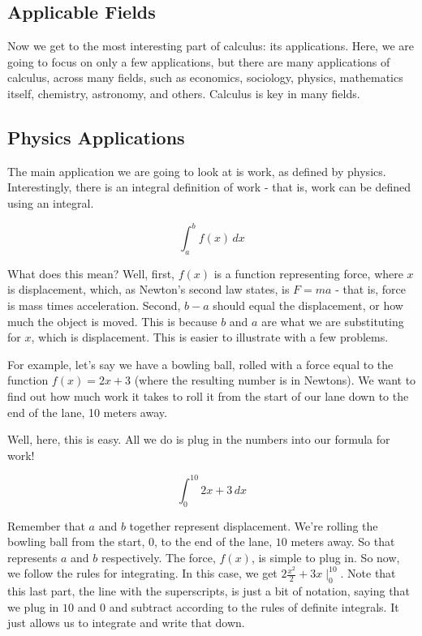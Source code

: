 \subsection{Applicable Fields}
Now we get to the most interesting part of calculus: its applications. 
Here, we are going to focus on only a few applications, but there are many applications of calculus, across many fields, such as economics, sociology, physics, mathematics itself, chemistry, astronomy, and others. 
Calculus is key in many fields.
\subsection{Physics Applications}
The main application we are going to look at is work, as defined by physics. 
Interestingly, there is an integral definition of work - that is, work can be defined using an integral.

\begin{equation*}
    \int^b_a f(x) \, dx
\end{equation*}

What does this mean? 
Well, first, $f(x)$ is a function representing force, where $x$ is displacement, which, as Newton's second law states, is $F = ma$ - that is, force is mass times acceleration. 
Second, $b - a$ should equal the displacement, or how much the object is moved. This is because $b$ and $a$ are what we are substituting for $x$, which is displacement.
This is easier to illustrate with a few problems.

For example, let's say we have a bowling ball, rolled with a force equal to the function $f(x) = 2x+3$ (where the resulting number is in Newtons). 
We want to find out how much work it takes to roll it from the start of our lane down to the end of the lane, 10 meters away.

Well, here, this is easy. All we do is plug in the numbers into our formula for work! 

\begin{equation*}
    \int^{10}_0 2x+3 \, dx
\end{equation*}

Remember that $a$ and $b$ together represent displacement. 
We're rolling the bowling ball from the start, $0$, to the end of the lane, $10$ meters away. 
So that represents $a$ and $b$ respectively. 
The force, $f(x)$, is simple to plug in. 
So now, we follow the rules for integrating. 
In this case, we get $2\frac{x^2}{2}+3x\mid^{10}_0$. 
Note that this last part, the line with the superscripts, is just a bit of notation, saying that we plug in $10$ and $0$ and subtract according to the rules of definite integrals. 
It just allows us to integrate and write that down. 

